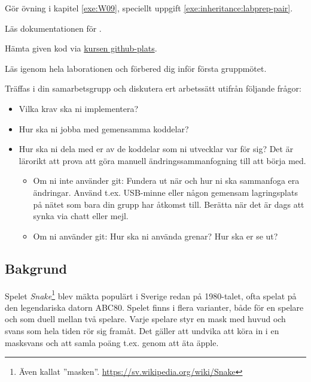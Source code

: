 
\Teamlab{\LabWeekTEN}

\begin{Goals}

\end{Goals}

\begin{Preparations}
\item Gör övning {\tt \ExeWeekNINE} i kapitel \ref{exe:W09}, speciellt uppgift \ref{exe:inheritance:labprep-pair}.
\item Läs dokumentationen för .
\item Hämta given kod via \href{https://github.com/lunduniversity/introprog/tree/master/workspace/}{kursen github-plats}.
\item Läs igenom hela laborationen och förbered dig inför första gruppmötet.

\item Träffas i din samarbetsgrupp och diskutera ert arbetssätt utifrån följande frågor:
\begin{itemize}[nolistsep]
  \item Vilka krav ska ni implementera?
  \item Hur ska ni jobba med gemensamma koddelar?
  \item Hur ska ni dela med er av de koddelar som ni utvecklar var för sig? Det är lärorikt att prova att göra manuell ändringssammanfogning till att börja med.
  \begin{itemize}[nolistsep]
  \item Om ni inte använder git: Fundera ut när och hur ni ska sammanfoga era ändringar. Använd t.ex. USB-minne eller någon gemensam lagringsplats på nätet som bara din grupp har åtkomst till. Berätta när det är dags att synka via chatt eller mejl.  
  \item Om ni använder git: Hur ska ni använda grenar? Hur ska er  se ut?
  \end{itemize}
\end{itemize}

\end{Preparations}

\subsection{Bakgrund}

Spelet \emph{Snake}\footnote{Även kallat ''masken''. \url{https://sv.wikipedia.org/wiki/Snake}} blev mäkta populärt i Sverige redan på 1980-talet, ofta spelat på den legendariska datorn ABC80. Spelet finns i flera varianter, både för en spelare och som duell mellan två spelare. Varje spelare styr en mask med huvud och svans som hela tiden rör sig framåt. Det gäller att undvika att köra in i en masksvans och att samla poäng t.ex. genom att äta äpple.


